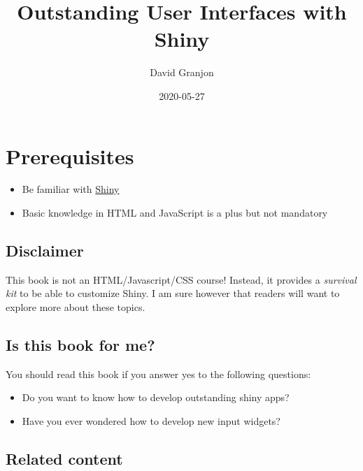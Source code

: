 \documentclass[]{book}
\title{Outstanding User Interfaces with Shiny}
\author{David Granjon}
\date{2020-05-27}
\providecommand{\tightlist}{%
  \setlength{\itemsep}{0pt}\setlength{\parskip}{0pt}}
\begin{document}
\maketitle

{
\setcounter{tocdepth}{1}
\tableofcontents
}
\hypertarget{prerequisites}{%
\chapter*{Prerequisites}\label{prerequisites}}

\begin{itemize}
\tightlist
\item
  Be familiar with \href{https://mastering-shiny.org}{Shiny}
\item
  Basic knowledge in HTML and JavaScript is a plus but not mandatory
\end{itemize}

\hypertarget{disclaimer}{%
\section*{Disclaimer}\label{disclaimer}}

This book is not an HTML/Javascript/CSS course! Instead, it provides a \emph{survival kit} to be able to customize Shiny. I am sure however that readers will want to explore more about these topics.

\hypertarget{is-this-book-for-me}{%
\section*{Is this book for me?}\label{is-this-book-for-me}}

You should read this book if you answer yes to the following questions:

\begin{itemize}
\tightlist
\item
  Do you want to know how to develop outstanding shiny apps?
\item
  Have you ever wondered how to develop new input widgets?
\end{itemize}

\hypertarget{related-content}{%
\section*{Related content}\label{related-content}}
\end{document}
